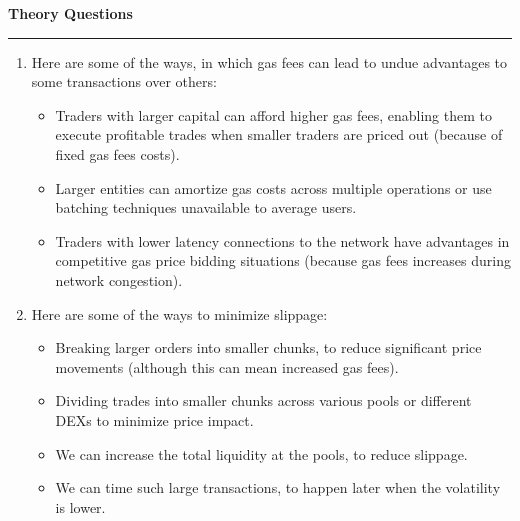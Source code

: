 \documentclass[a4paper]{article}
\newenvironment{solution}[2][]{%
\begin{mdframed}[linecolor=blue!70!black, linewidth=2pt, roundcorner=10pt, backgroundcolor=yellow!10!white, skipabove=12pt, skipbelow=12pt]%
	\textbf{\large #2}
	\par\noindent\rule{\textwidth}{0.4pt}
}{
\end{mdframed}
}
\begin{document}
\begin{solution}{Theory Questions}
\begin{enumerate}
	\item Here are some of the ways, in which gas fees can lead to undue advantages to some transactions over others:
	
	\begin{itemize}
		\item Traders with larger capital can afford higher gas fees, enabling them to execute profitable trades when smaller traders are priced out (because of fixed gas fees costs).
		\item Larger entities can amortize gas costs across multiple operations or use batching techniques unavailable to average users.
		\item Traders with lower latency connections to the network have advantages in competitive gas price bidding situations (because gas fees increases during network congestion).
	\end{itemize}

	\item Here are some of the ways to minimize slippage:
	\begin{itemize}
		\item Breaking larger orders into smaller chunks, to reduce significant price movements (although this can mean increased gas fees).
		\item Dividing trades into smaller chunks across various pools or different DEXs to minimize price impact.
		\item We can increase the total liquidity at the pools, to reduce slippage.
		\item We can time such large transactions, to happen later when the volatility is lower.
	\end{itemize}


\end{enumerate}
\end{solution}
\end{document}

